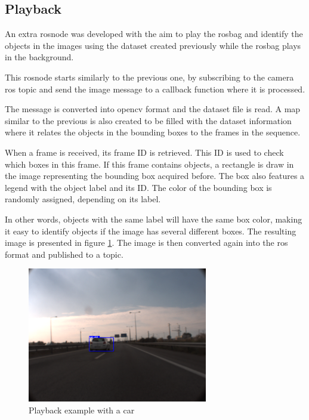 \subsection{Playback}

An extra rosnode was developed with the aim to play the rosbag and identify the objects in the images using the dataset created previously while the rosbag plays in the background.

This rosnode starts similarly to the previous one, by subscribing to the camera \gls{ros} topic and send the image message to a callback function where it is processed. 

The message is converted into \gls{opencv} format and the dataset file is read. A map similar to the previous is also created to be filled with the dataset information where it relates the objects in the bounding boxes to the frames in the sequence. 

When a frame is received, its frame ID is retrieved. This ID is used to check which boxes in this frame. If this frame contains objects, a rectangle is draw in the image representing the bounding box acquired before. The box also features a legend with the object label and its ID. The color of the bounding box is randomly assigned, depending on its label. 

In other words, objects with the same label will have the same box color, making it easy to identify objects if the image has several different boxes. The resulting image is presented in figure \ref{fig:playback}. The image is then converted again into the \gls{ros} format and published to a topic.

\begin{figure}[htp]
	
	\centering
	\includegraphics[width=0.7\textwidth]{caplabel/imgs/playback.png}
	
	\caption{Playback example with a car}
	\label{fig:playback}
	
\end{figure}







